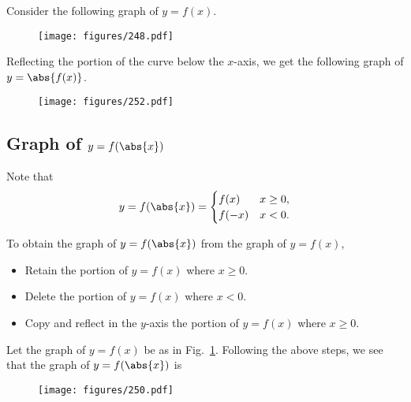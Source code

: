 \begin{example}[Graph of $y = \abs{f(x)}$]
    Consider the following graph of $y = f(x)$.
    \begin{figure}[H]
        \centering
        \hspace{7em}\texttt{[image: figures/248.pdf]}
        \caption{\label{fig:248}}
    \end{figure}
    Reflecting the portion of the curve below the $x$-axis, we get the following graph of $y = \abs{f(x)}$.
    \begin{figure}[H]
        \centering
        \hspace{7em}\texttt{[image: figures/252.pdf]}
        \caption{}
    \end{figure}
\end{example}

\subsection{Graph of \texorpdfstring{$y = f(\abs{x})$}{y = f(|x|)}}

Note that \[y = f(\abs{x}) = \begin{cases}
    f(x) & x \geq 0,\\
    f(-x) & x < 0.
\end{cases}\]

\begin{recipe}[Graph of $y = f(\abs{x})$]
    To obtain the graph of $y = f(\abs{x})$ from the graph of $y = f(x)$,
    \begin{itemize}
        \item Retain the portion of $y = f(x)$ where $x \geq 0$.
        \item Delete the portion of $y = f(x)$ where $x < 0$.
        \item Copy and reflect in the $y$-axis the portion of $y = f(x)$ where $x \geq 0$.
    \end{itemize}
\end{recipe}

\begin{example}[Graph of $y = f(\abs{x})$]
    Let the graph of $y = f(x)$ be as in Fig.~\ref{fig:248}. Following the above steps, we see that the graph of $y = f(\abs{x})$ is
    \begin{figure}[H]
        \centering
        \hspace{7em}\texttt{[image: figures/250.pdf]}
        \caption{}
    \end{figure}
\end{example}

